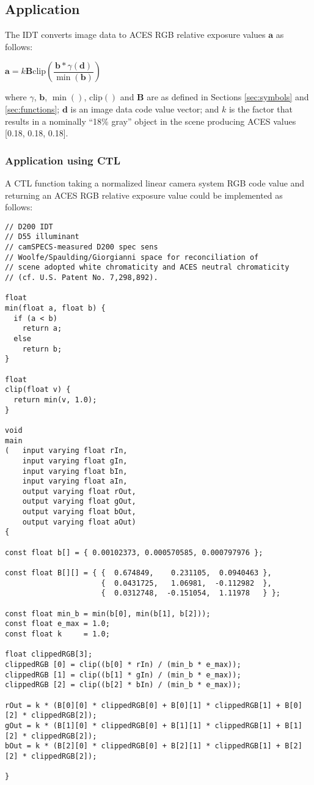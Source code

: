 \subsection{Application}
\label{sec:application}
The IDT converts image data to ACES RGB relative exposure values $\mathbf{a}$ as follows:


$\mathbf{a} = k \mathbf{B} \mathrm{clip}\left(\dfrac{\mathbf{b}*\gamma(\mathbf{d})}{\min(\mathbf{b})}\right)$

where $\gamma$, $\mathbf{b}$, $\min()$, clip$()$ and $\mathbf{B}$ are as defined in Sections \ref{sec:symbols} and \ref{sec:functions}; $\mathbf{d}$ is an image data code value vector; and $k$ is the factor that results in a nominally ``18\% gray'' object in the scene producing ACES values [0.18, 0.18, 0.18].


\subsubsection{Application using CTL}
A CTL function taking a normalized linear camera system RGB code value and returning an ACES RGB relative exposure value could be implemented as follows:

\cleardoublepage
\begin{lstlisting}
// D200 IDT
// D55 illuminant
// camSPECS-measured D200 spec sens
// Woolfe/Spaulding/Giorgianni space for reconciliation of
// scene adopted white chromaticity and ACES neutral chromaticity
// (cf. U.S. Patent No. 7,298,892).

float
min(float a, float b) {
  if (a < b)
    return a;
  else
    return b;
}

float
clip(float v) {
  return min(v, 1.0);
}

void
main
(   input varying float rIn,
    input varying float gIn,
    input varying float bIn,
    input varying float aIn,
    output varying float rOut,
    output varying float gOut,
    output varying float bOut,
    output varying float aOut)
{

const float b[] = { 0.00102373, 0.000570585, 0.000797976 };

const float B[][] = { {  0.674849,    0.231105,  0.0940463 },
                      {  0.0431725,   1.06981,  -0.112982  },
                      {  0.0312748,  -0.151054,  1.11978   } };

const float min_b = min(b[0], min(b[1], b[2]));
const float e_max = 1.0;
const float k     = 1.0;

float clippedRGB[3];
clippedRGB [0] = clip((b[0] * rIn) / (min_b * e_max));
clippedRGB [1] = clip((b[1] * gIn) / (min_b * e_max));
clippedRGB [2] = clip((b[2] * bIn) / (min_b * e_max));

rOut = k * (B[0][0] * clippedRGB[0] + B[0][1] * clippedRGB[1] + B[0][2] * clippedRGB[2]);
gOut = k * (B[1][0] * clippedRGB[0] + B[1][1] * clippedRGB[1] + B[1][2] * clippedRGB[2]);
bOut = k * (B[2][0] * clippedRGB[0] + B[2][1] * clippedRGB[1] + B[2][2] * clippedRGB[2]);

}
\end{lstlisting}

